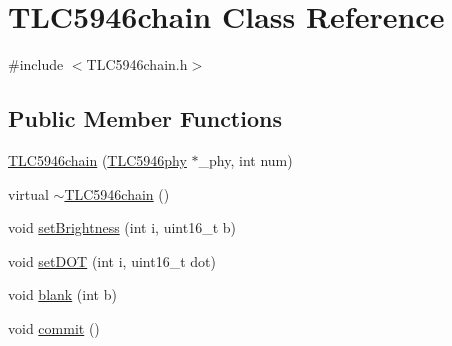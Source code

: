 \hypertarget{class_t_l_c5946chain}{\section{T\-L\-C5946chain Class Reference}
\label{class_t_l_c5946chain}
}


{\ttfamily \#include $<$T\-L\-C5946chain.\-h$>$}

\subsection*{Public Member Functions}
\begin{DoxyCompactItemize}
\item 
\hyperlink{class_t_l_c5946chain_aecaa6fa30d0db782a8b382c6618c34a7}{T\-L\-C5946chain} (\hyperlink{class_t_l_c5946phy}{T\-L\-C5946phy} $\ast$\-\_\-phy, int num)
\item 
virtual \hyperlink{class_t_l_c5946chain_a0035f5d1ccd467eaf1ac37262cbf4c60}{$\sim$\-T\-L\-C5946chain} ()
\item 
void \hyperlink{class_t_l_c5946chain_af53b7ea5210b5a3862b824de82fb0167}{set\-Brightness} (int i, uint16\-\_\-t b)
\item 
void \hyperlink{class_t_l_c5946chain_a748083a734df2a9ea89d910e3c1a88b8}{set\-D\-O\-T} (int i, uint16\-\_\-t dot)
\item 
void \hyperlink{class_t_l_c5946chain_a97cb65c2331f1b6d82f3fdef2bcffa2f}{blank} (int b)
\item 
void \hyperlink{class_t_l_c5946chain_a87c446b0aee06efcd78dfd659a8b7502}{commit} ()
\end{DoxyCompactItemize}


